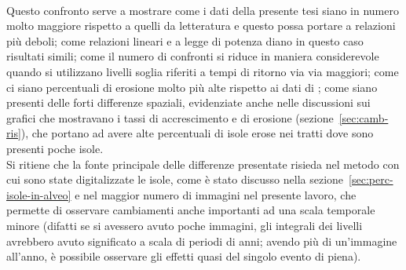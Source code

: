 %
\\
Questo confronto serve a mostrare come i dati della presente tesi siano in numero molto maggiore rispetto a quelli da letteratura e questo possa portare a relazioni più deboli;
come relazioni lineari e a legge di potenza diano in questo caso risultati simili;
come il numero di confronti si riduce in maniera considerevole quando si utilizzano livelli soglia riferiti a tempi di ritorno via via maggiori;
come ci siano percentuali di erosione molto più alte rispetto ai dati di ;
come siano presenti delle forti differenze spaziali, evidenziate anche nelle discussioni sui grafici che mostravano i tassi di accrescimento e di erosione (sezione~\ref{sec:camb-ris}), che portano ad avere alte percentuali di isole erose nei tratti dove sono presenti poche isole.
\\
Si ritiene che la fonte principale delle differenze presentate risieda nel metodo con cui sono state digitalizzate le isole, come è stato discusso nella sezione~\ref{sec:perc-isole-in-alveo} e nel maggior numero di immagini nel presente lavoro, che permette di osservare cambiamenti anche importanti ad una scala temporale minore (difatti se si avessero avuto poche immagini, gli integrali dei livelli avrebbero avuto significato a scala di periodi di anni; avendo più di un'immagine all'anno, è possibile osservare gli effetti quasi del singolo evento di piena).



